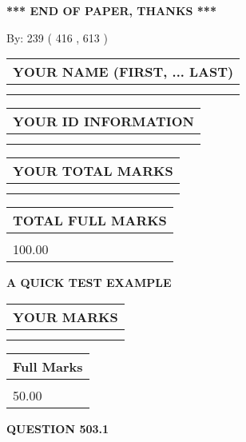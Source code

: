 \documentclass[12pt]{article}
\begin{document}
\vspace{1.0in} 
{\textbf{\large{ *** END OF PAPER, THANKS *** }}} 
   
   
\hspace{1.0in} By: 
 239 ( 416 ,  613 )
   
   
   
   
\newpage 
\setcounter{page}{ 
   503001 } 
   
   
   
   
\noindent\begin{tabular}{|l|}
\hline
YOUR NAME (FIRST, ... LAST)  \\
\hline
 \\ 
 \\ 
\hline
\end{tabular}
\hspace{0.05in} \begin{tabular}{|l|}
\hline
 YOUR   ID   INFORMATION  \\
\hline
 \\ 
 \\ 
\hline
\end{tabular}
   
   
\vspace{0.2in}\noindent\begin{tabular}{|l|}
\hline
YOUR TOTAL MARKS  \\
\hline
 \\ 
 \\ 
\hline
\end{tabular}
\hspace{0.05in} \begin{tabular}{|l|}
\hline
TOTAL FULL MARKS  \\
\hline
 \\ 
100.00 \\
\hline
\end{tabular}
   
   
 \vspace{0.2in}
{\LARGE {\textbf{ A QUICK TEST EXAMPLE}}}
   
   
  
\vspace{0.2in}
  
\noindent\begin{tabular}{|l|}
\hline
 YOUR MARKS  \\
\hline
 \\ 
 \\ 
\hline
\end{tabular}
\hspace{0.05in} \begin{tabular}{|l|}
\hline
 Full Marks  \\
\hline
 \\ 
50.00 \\
\hline
\end{tabular}
{\textbf{\Large{QUESTION
503.1 
}}}
  
\end{document}
